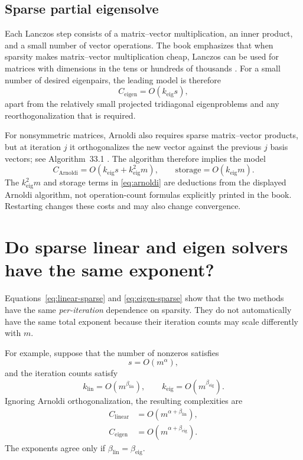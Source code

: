 \documentclass[11pt,a4paper]{article}
\begin{document}
\subsection{Sparse partial eigensolve}

Each Lanczos step consists of a matrix--vector multiplication, an inner
product, and a small number of vector operations.  The book emphasizes that
when sparsity makes matrix--vector multiplication cheap, Lanczos can be used
for matrices with dimensions in the tens or hundreds of thousands
\cite[p.~278]{trefethenbau}.  For a small number of desired eigenpairs, the
leading model is therefore
\begin{equation}
  C_{\mathrm{eigen}}=O\!\left(k_{\mathrm{eig}}s\right),
  \label{eq:eigen-sparse}
\end{equation}
apart from the relatively small projected tridiagonal eigenproblems and any
reorthogonalization that is required.

For nonsymmetric matrices, Arnoldi also requires sparse matrix--vector
products, but at iteration $j$ it orthogonalizes the new vector against the
previous $j$ basis vectors; see Algorithm~33.1
\cite[pp.~252--253]{trefethenbau}.  The algorithm therefore implies the model
\begin{equation}
  C_{\mathrm{Arnoldi}}
  =O\!\left(k_{\mathrm{eig}}s+k_{\mathrm{eig}}^2m\right),
  \qquad
  \text{storage}=O(k_{\mathrm{eig}}m).
  \label{eq:arnoldi}
\end{equation}
The $k_{\mathrm{eig}}^2m$ and storage terms in
\eqref{eq:arnoldi} are deductions from the displayed Arnoldi algorithm, not
operation-count formulas explicitly printed in the book.  Restarting changes
these costs and may also change convergence.

\section{Do sparse linear and eigen solvers have the same exponent?}

Equations~\eqref{eq:linear-sparse} and \eqref{eq:eigen-sparse} show that the
two methods have the same \emph{per-iteration} dependence on sparsity.  They do
not automatically have the same total exponent because their iteration counts
may scale differently with $m$.

For example, suppose that the number of nonzeros satisfies
\begin{equation}
  s=O(m^\alpha),
\end{equation}
and the iteration counts satisfy
\begin{equation}
  k_{\mathrm{lin}}=O(m^{\beta_{\mathrm{lin}}}),
  \qquad
  k_{\mathrm{eig}}=O(m^{\beta_{\mathrm{eig}}}).
\end{equation}
Ignoring Arnoldi orthogonalization, the resulting complexities are
\begin{align}
  C_{\mathrm{linear}}&=O(m^{\alpha+\beta_{\mathrm{lin}}}),\\
  C_{\mathrm{eigen}}&=O(m^{\alpha+\beta_{\mathrm{eig}}}).
\end{align}
The exponents agree only if
$\beta_{\mathrm{lin}}=\beta_{\mathrm{eig}}$.
\end{document}
